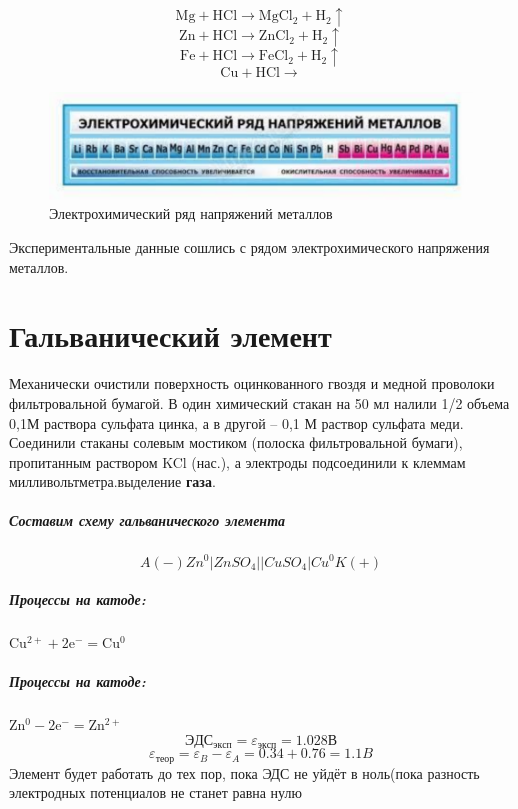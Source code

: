 \documentclass[a4paper,12pt]{article}
\begin{document}
\begin{equation} 
\mathrm{Mg + HCl \longrightarrow MgCl_2 + H_2\uparrow } 
\end{equation} 
\begin{equation} 
\mathrm{Zn + HCl \longrightarrow ZnCl_2 + H_2\uparrow } 
\end{equation} 
\begin{equation} 
\mathrm{Fe + HCl \longrightarrow FeCl_2 + H_2\uparrow } 
\end{equation} 
\begin{equation} 
\mathrm{Cu + HCl \longrightarrow  } 
\end{equation} 
\begin{figure}[h] 
 
\centering 
 
\includegraphics[scale=1]{series.pdf} 
 
\caption{Электрохимический ряд напряжений металлов} 
 
\label{fig:mpr} 
\end{figure}  
Экспериментальные данные сошлись с рядом электрохимического напряжения металлов.  
 
\section{Гальванический элемент} 
Механически очистили поверхность оцинкованного гвоздя и медной проволоки 
фильтровальной бумагой. В один химический стакан на 50 мл налили 1/2 объема 0,1М 
раствора сульфата цинка, а в другой – 0,1 М раствор сульфата меди. Соединили стаканы 
солевым мостиком (полоска фильтровальной бумаги), пропитанным раствором KCl (нас.), 
а электроды подсоединили к клеммам милливольтметра.выделение \textbf{газа}. 
 
\subparagraph{Составим схему гальванического элемента} 
 
\begin{equation} 
A(-) Zn^0 | ZnSO_4 || CuSO_4 | Cu^0 K(+)  
 \end{equation}
 
\subparagraph{Процессы на катоде:} $\mathrm{Cu^{2+}+2e^-=Cu^0}$
\subparagraph{Процессы на катоде:} $\mathrm{Zn^{0}-2e^-=Zn^{2+}}$
\begin{equation} 
ЭДС_{эксп}=\varepsilon_{эксп}=1.028В 
\end{equation} 
\begin{equation} 
\varepsilon_{теор}=\varepsilon_{B}-\varepsilon_{A}=0.34+0.76=1.1B 
\end{equation} 
 Элемент будет работать до тех пор, пока  ЭДС не уйдёт в ноль(пока разность электродных потенциалов не станет равна нулю  
\end{document}
